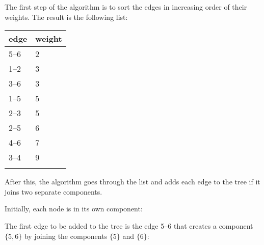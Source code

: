 \begin{samepage}
The first step of the algorithm is to sort the
edges in increasing order of their weights.
The result is the following list:

\begin{tabular}{ll}
\\
edge & weight \\
\hline
5--6 & 2 \\
1--2 & 3 \\
3--6 & 3 \\
1--5 & 5 \\
2--3 & 5 \\
2--5 & 6 \\
4--6 & 7 \\
3--4 & 9 \\
\\
\end{tabular}
\end{samepage}

After this, the algorithm goes through the list
and adds each edge to the tree if it joins
two separate components.

Initially, each node is in its own component:

\begin{center}
\end{center}
The first edge to be added to the tree is
the edge 5--6 that creates a component $\{5,6\}$
by joining the components $\{5\}$ and $\{6\}$:

